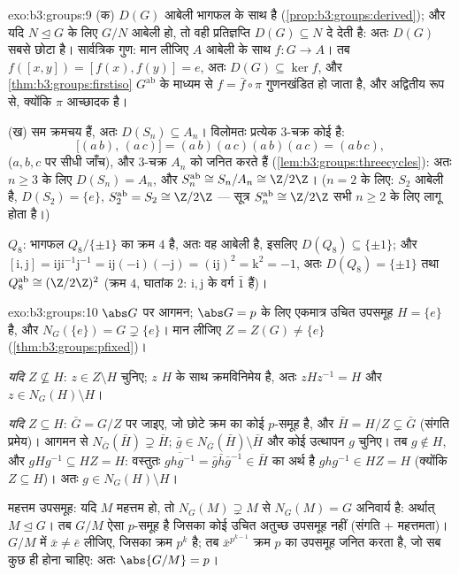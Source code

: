 \begin{solution}{exo:b3:groups:9}
(क) $D(G)$ आबेली भागफल के साथ  है (\cref{prop:b3:groups:derived}); और यदि $N \trianglelefteq G$ के
लिए $G/N$ आबेली हो, तो वही प्रतिज्ञप्ति $D(G) \subseteq N$ दे देती है: अतः $D(G)$
सबसे छोटा है। सार्वत्रिक गुण: मान लीजिए $A$ आबेली के साथ $f \colon G \to A$।
तब $f([x,y]) = [f(x), f(y)] = e$, अतः $D(G)
\subseteq \ker f$, और \cref{thm:b3:groups:firstiso} $G^{\mathrm{ab}}$ के माध्यम से $f =
\bar f \circ \pi$ गुणनखंडित
हो जाता है, और अद्वितीय रूप से, क्योंकि $\pi$ आच्छादक है।

(ख)  सम क्रमचय हैं, अतः $D(S_n) \subseteq A_n$। विलोमतः प्रत्येक $3$-चक्र
कोई  है:
\[
\bigl[(a\,b),\,(a\,c)\bigr] = (a\,b)(a\,c)(a\,b)(a\,c) =
(a\,b\,c),
\]
($a, b, c$ पर सीधी जाँच), और $3$-चक्र $A_n$ को जनित करते हैं (\cref{lem:b3:groups:threecycles}):
अतः $n \geq 3$ के लिए $D(S_n) = A_n$, और $S_n^{\mathrm{ab}} \cong S_n/A_n \cong \Z/2\Z$। ($n = 2$ के लिए: $S_2$ आबेली है,
$D(S_2) = \{e\}$, $S_2^{\mathrm{ab}} = S_2
\cong \Z/2\Z$ --- सूत्र $S_n^{\mathrm{ab}} \cong \Z/2\Z$ सभी $n \geq 2$ के लिए लागू होता है।)

$Q_8$: भागफल $Q_8/\{\pm 1\}$ का क्रम $4$ है, अतः वह आबेली है, इसलिए $D(Q_8) \subseteq \{\pm 1\}$;
और $[\mathrm i, \mathrm
j] = \mathrm i \mathrm j \mathrm i^{-1}\mathrm j^{-1} = \mathrm
i\mathrm j(-\mathrm i)(-\mathrm j) = (\mathrm i \mathrm j)^2 =
\mathrm k^2 = -1$, अतः $D(Q_8) = \{\pm 1\}$ तथा $Q_8^{\mathrm{ab}} \cong (\Z/2\Z)^2$ (क्रम $4$, घातांक $2$: $\mathrm i, \mathrm j$ के
वर्ग $\bar 1$ हैं)।
\end{solution}

\begin{solution}{exo:b3:groups:10}
$\abs G$ पर आगमन; $\abs G = p$ के लिए एकमात्र उचित उपसमूह $H = \{e\}$ है, और $N_G(\{e\}) = G \supsetneq
\{e\}$।
मान लीजिए $Z = Z(G) \neq \{e\}$ (\cref{thm:b3:groups:pfixed})।

\emph{यदि $Z \not\subseteq H$}: $z \in Z \setminus H$ चुनिए; $z$ $H$ के साथ क्रमविनिमेय है,
अतः $zHz^{-1} = H$ और $z \in N_G(H) \setminus
H$।

\emph{यदि $Z \subseteq H$}: $\bar G = G/Z$ पर जाइए, जो छोटे क्रम का कोई $p$-समूह है,
और $\bar H = H/Z \subsetneq \bar G$ (संगति प्रमेय)। आगमन से $N_{\bar G}(\bar H) \supsetneq \bar H$; $\bar g \in N_{\bar G}(\bar H) \setminus \bar H$ और कोई उत्थापन $g$
चुनिए। तब $g \notin H$, और $gHg^{-1} \subseteq HZ = H$: वस्तुतः $\overline{ghg^{-1}} = \bar g \bar h \bar g^{-1} \in \bar H$ का अर्थ है $ghg^{-1} \in HZ = H$ (क्योंकि
$Z \subseteq H$)। अतः $g \in
N_G(H)\setminus H$।

महत्तम उपसमूह: यदि $M$ महत्तम हो, तो $N_G(M) \supsetneq M$ से $N_G(M) = G$ अनिवार्य है:
अर्थात् $M \trianglelefteq G$। तब $G/M$ ऐसा $p$-समूह है जिसका कोई उचित अतुच्छ
उपसमूह नहीं (संगति + महत्तमता)। $G/M$ में $\bar x \neq \bar e$ लीजिए, जिसका क्रम
$p^k$ है; तब $\bar x^{p^{k-1}}$ क्रम $p$ का उपसमूह जनित करता है, जो सब कुछ ही
होना चाहिए: अतः $\abs{G/M} = p$।
\end{solution}

